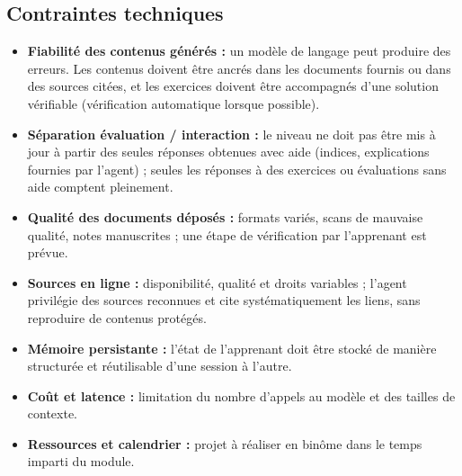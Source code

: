 \documentclass[11pt,a4paper]{article}
\begin{document}
\subsection{Contraintes techniques}

\begin{itemize}[noitemsep]
  \item \textbf{Fiabilité des contenus générés :} un modèle de langage peut produire des erreurs. Les contenus doivent être ancrés dans les documents fournis ou dans des sources citées, et les exercices doivent être accompagnés d'une solution vérifiable (vérification automatique lorsque possible).
  \item \textbf{Séparation évaluation / interaction :} le niveau ne doit pas être mis à jour à partir des seules réponses obtenues avec aide (indices, explications fournies par l'agent) ; seules les réponses à des exercices ou évaluations sans aide comptent pleinement.
  \item \textbf{Qualité des documents déposés :} formats variés, scans de mauvaise qualité, notes manuscrites ; une étape de vérification par l'apprenant est prévue.
  \item \textbf{Sources en ligne :} disponibilité, qualité et droits variables ; l'agent privilégie des sources reconnues et cite systématiquement les liens, sans reproduire de contenus protégés.
  \item \textbf{Mémoire persistante :} l'état de l'apprenant doit être stocké de manière structurée et réutilisable d'une session à l'autre.
  \item \textbf{Coût et latence :} limitation du nombre d'appels au modèle et des tailles de contexte.
  \item \textbf{Ressources et calendrier :} projet à réaliser en binôme dans le temps imparti du module.
\end{itemize}

\end{document}
